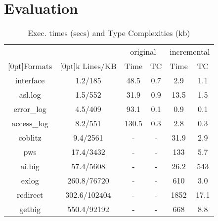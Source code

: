 \section{Evaluation} \label{sec:eval}

\begin{table}[t]
\begin{center}
\begin{tabular}{|c|c|c|c|c|c|}\hline
& & \multicolumn{2}{|c|}{original} & \multicolumn{2}{|c|}{incremental} \\ \cline{3-6}
\raisebox{1.5ex}[0pt]{Formats} & \raisebox{1.5ex}[0pt]{k Lines/KB} & 
	Time & TC & Time & TC \\ \hline \hline
interface & 1.2/185		& 48.5	& 0.7	& 2.9	& 1.1 \\ \hline
asl.log  &	1.5/552		& 31.9	& 0.9	& 13.5 	& 1.5 \\ \hline
error\_log  &	4.5/409		& 93.1	& 0.1	& 0.9	& 0.1 \\ \hline
access\_log  &	8.2/551 	& 130.5	& 0.3	& 2.8	& 0.3	\\ \hline
coblitz	     & 9.4/2561   	& -	& -	& 31.9 & 2.9 \\ \hline
pws	&	 17.4/3432	& -	& - 	& 133  & 5.7 \\ \hline
ai.big	&	57.4/5608	& -	& -	& 26.2	& 543 \\ \hline
exlog & 260.8/76720 		& -	& -	& 610 & 3.0 \\ \hline
redirect & 302.6/102404 	& -	& -	& 1852 & 17.1 \\ \hline
getbig & 550.4/92192   		& -	& -	& 668 & 8.8 \\ \hline
\end{tabular}
\caption{Exec. times (secs) and Type Complexities (kb)} 
\label{tab:results}
\end{center}
\end{table}

